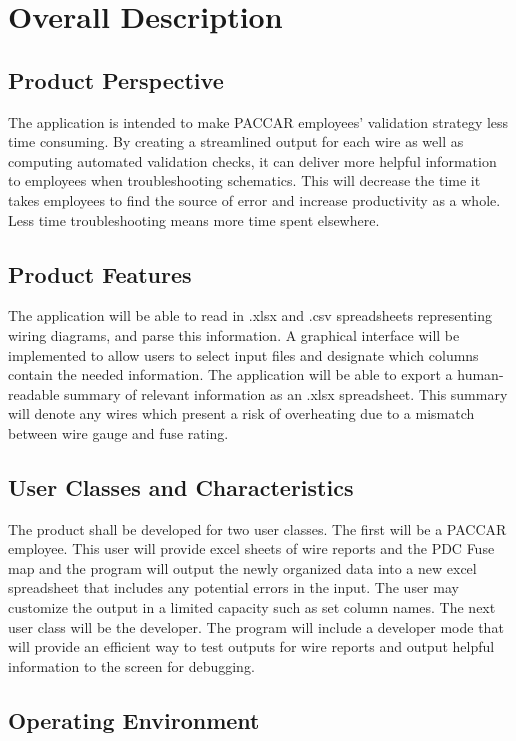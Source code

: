 \section{Overall Description}

\subsection{Product Perspective}
 The application is intended to make PACCAR employees' validation strategy less time consuming. By creating a streamlined output for each wire as well as computing automated validation checks, it can deliver more helpful information to employees when troubleshooting schematics. This will decrease the time it takes employees to find the source of error and increase productivity as a whole. Less time troubleshooting means more time spent elsewhere.

\subsection{Product Features}
 The application will be able to read in .xlsx and .csv spreadsheets representing wiring diagrams, and parse this information. A graphical interface will be implemented to allow users to select input files and designate which columns contain the needed information. The application will be able to export a human-readable summary of relevant information as an .xlsx spreadsheet. This summary will denote any wires which present a risk of overheating due to a mismatch between wire gauge and fuse rating.

\subsection{User Classes and Characteristics}
  The product shall be developed for two user classes. The first will be a PACCAR employee. This user will provide excel sheets of wire reports and the PDC Fuse map and the program will output the newly organized data into a new excel spreadsheet that includes any potential errors in the input. The user may customize the output in a limited capacity such as set column names. The next user class will be the developer. The program will include a developer mode that will provide an efficient way to test outputs for wire reports and output helpful information to the screen for debugging.

\subsection{Operating Environment}


